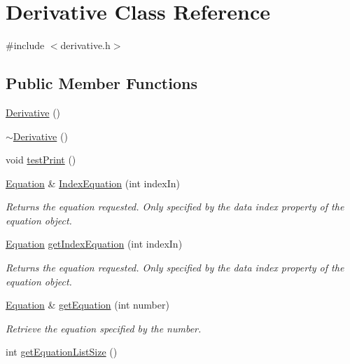 \hypertarget{class_derivative}{\section{Derivative Class Reference}
\label{class_derivative}
}


{\ttfamily \#include $<$derivative.\-h$>$}

\subsection*{Public Member Functions}
\begin{DoxyCompactItemize}
\item 
\hyperlink{class_derivative_adc03ec3ad150bc0de66a3e7200cd368f}{Derivative} ()
\item 
\hyperlink{class_derivative_a7fc4ee53f460dfb98b3db2e9c9830cf9}{$\sim$\-Derivative} ()
\item 
void \hyperlink{class_derivative_afe00a18765c0d70c3232a41f5ac663dd}{test\-Print} ()
\item 
\hyperlink{class_equation}{Equation} \& \hyperlink{class_derivative_a67683204d8c601c9a78e4459dd05ce86}{Index\-Equation} (int index\-In)
\begin{DoxyCompactList}\small\item\em Returns the equation requested. Only specified by the data index property of the equation object. \end{DoxyCompactList}\item 
\hyperlink{class_equation}{Equation} \hyperlink{class_derivative_af9b75e66d998bc3ad82250c6667d0c17}{get\-Index\-Equation} (int index\-In)
\begin{DoxyCompactList}\small\item\em Returns the equation requested. Only specified by the data index property of the equation object. \end{DoxyCompactList}\item 
\hyperlink{class_equation}{Equation} \& \hyperlink{class_derivative_ad3bda57577b0e540eb02612610a20156}{get\-Equation} (int number)
\begin{DoxyCompactList}\small\item\em Retrieve the equation specified by the number. \end{DoxyCompactList}\item 
int \hyperlink{class_derivative_ac95af6fb993314a578b3f0d3cd57a9cc}{get\-Equation\-List\-Size} ()
\end{DoxyCompactItemize}
